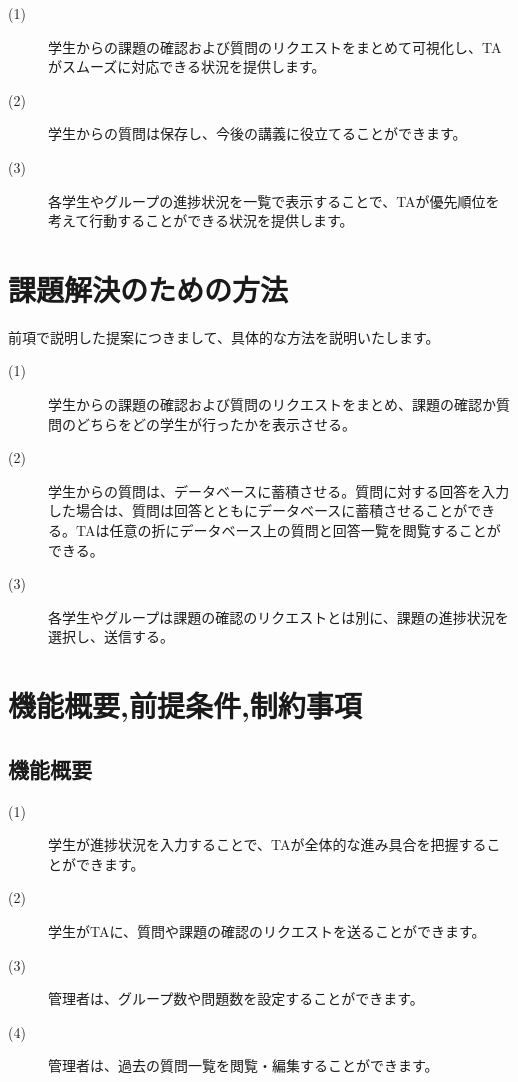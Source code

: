 \documentclass[a4j,titlepage]{ujarticle}
\begin{document}
\begin{description}
\item[(1)]学生からの課題の確認および質問のリクエストをまとめて可視化し、TAがスムーズに対応できる状況を提供します。
\item[(2)]学生からの質問は保存し、今後の講義に役立てることができます。
\item[(3)]各学生やグループの進捗状況を一覧で表示することで、TAが優先順位を考えて行動することができる状況を提供します。
\end{description}

\section{課題解決のための方法}
前項で説明した提案につきまして、具体的な方法を説明いたします。
\begin{description}
\item[(1)]学生からの課題の確認および質問のリクエストをまとめ、課題の確認か質問のどちらをどの学生が行ったかを表示させる。
\item[(2)]学生からの質問は、データベースに蓄積させる。質問に対する回答を入力した場合は、質問は回答とともにデータベースに蓄積させることができる。TAは任意の折にデータベース上の質問と回答一覧を閲覧することができる。
\item[(3)]各学生やグループは課題の確認のリクエストとは別に、課題の進捗状況を選択し、送信する。
\end{description}

\section{機能概要,前提条件,制約事項}

\subsection{機能概要}
\begin{description}
\item[(1)]学生が進捗状況を入力することで、TAが全体的な進み具合を把握することができます。
\item[(2)]学生がTAに、質問や課題の確認のリクエストを送ることができます。
\item[(3)]管理者は、グループ数や問題数を設定することができます。
\item[(4)]管理者は、過去の質問一覧を閲覧・編集することができます。　
\end{description}
\end{document}
